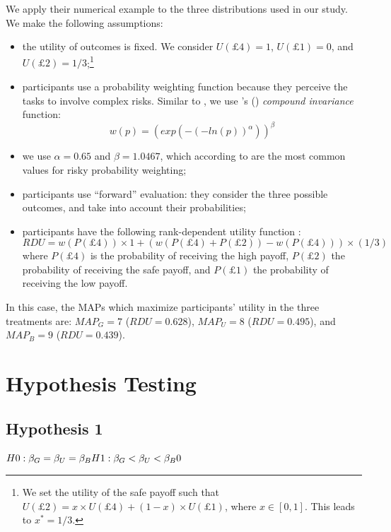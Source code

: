 We apply their numerical example to the three distributions used in our study.
We make the following assumptions:
\begin{itemize}
\item the utility of outcomes is fixed. We consider $U(\pounds4) = 1$, $U(\pounds1) = 0$, and $U(\pounds2) = 1/3$;\footnote{
We set the utility of the safe payoff such that $U(\pounds2) = x \times U(\pounds4) + (1-x) \times U(\pounds1)$, where $x \in [0,1]$.
This leads to $x^* = 1/3$.
}
\item participants use a probability weighting function because they perceive the tasks to involve complex risks. Similar to \cite{Li2020a}, we use \citeauthor{Prelec1998}'s (\citeyear{Prelec1998}) \textit{compound invariance} function:
$$w(p) = (exp(-(-ln(p))^\alpha))^\beta$$ 
\item we use $\alpha = 0.65$ and $\beta = 1.0467$, which according to \cite{Li2020a} are the most common values for risky probability weighting;
\item participants use ``forward'' evaluation: they consider the three possible outcomes, and take into account their probabilities;
\item participants have the following rank-dependent utility function \citep{Schneider2019}:
$$RDU = w(P(\pounds4)) \times 1 + (w(P(\pounds4) + P(\pounds2)) - w(P(\pounds4))) \times (1/3)$$
where $P(\pounds4)$ is the probability of receiving the high payoff, $P(\pounds2)$ the probability of receiving the safe payoff, and $P(\pounds1)$ the probability of receiving the low payoff.
\end{itemize}

In this case, the MAPs which maximize participants' utility in the three treatments are: $MAP_G = 7$ ($RDU = 0.628$), $MAP_U = 8$ ($RDU = 0.495$), and $MAP_B = 9$ ($RDU = 0.439$).

\section{Hypothesis Testing}
\label{section:appendixb}
\setcounter{figure}{0}
\setcounter{table}{0}
\renewcommand{\thefigure}{B.\arabic{figure}}
\renewcommand{\thetable}{B.\arabic{table}}

\subsection{Hypothesis 1}
$H0: \beta_G = \beta_U = \beta_B \\
H1: \beta_G < \beta_U < \beta_B 0$

